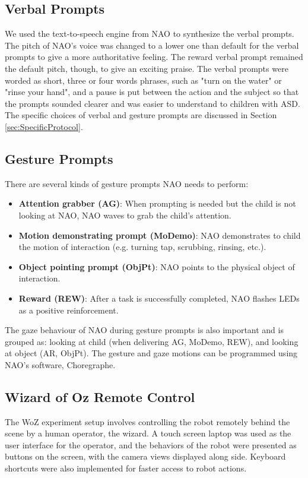 \subsection{Verbal Prompts}
We used the text-to-speech engine from NAO to synthesize the verbal prompts.  The pitch of NAO's voice was changed to a lower one than default for the verbal prompts to give a more authoritative feeling.  The reward verbal prompt remained the default pitch, though, to give an exciting praise.  The verbal prompts were worded as short, three or four words phrases, such as "turn on the water" or "rinse your hand", and a pause is put between the action and the subject so that the prompts sounded clearer and was easier to understand to children with ASD.  The specific choices of verbal and gesture prompts are discussed in Section \ref{sec:SpecificProtocol}.

\subsection{Gesture Prompts}
There are several kinds of gesture prompts NAO needs to perform:

\begin{itemize}
	\item \textbf{Attention grabber (AG)}:  When prompting is needed but the child is not looking at NAO, NAO waves to grab the child’s attention.
	\item \textbf{Motion demonstrating prompt (MoDemo)}:  NAO demonstrates to child the motion of interaction (e.g. turning tap, scrubbing, rinsing, etc.).
	\item \textbf{Object pointing prompt (ObjPt)}:  NAO points to the physical object of interaction.
	\item \textbf{Reward (REW)}:  After a task is successfully completed, NAO flashes LEDs as a positive reinforcement.
\end{itemize}

The gaze behaviour of NAO during gesture prompts is also important and is grouped as: looking at child (when delivering AG, MoDemo, REW), and looking at object (AR, ObjPt).  The gesture and gaze motions can be programmed using NAO's software, Choregraphe.

\subsection{Wizard of Oz Remote Control}
The WoZ experiment setup involves controlling the robot remotely behind the scene by a human operator, the wizard.  A touch screen laptop was used as the user interface for the operator, and the behaviors of the robot were presented as buttons on the screen, with the camera views displayed along side.  Keyboard shortcuts were also implemented for faster access to robot actions.
